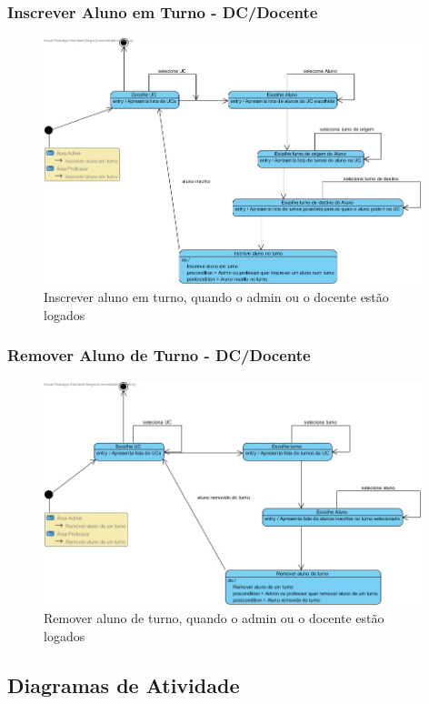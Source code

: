 \documentclass[a4paper]{article}
\begin{document}
\subsubsection{Inscrever Aluno em Turno - DC/Docente}
\begin{figure}[H]
\centering
\includegraphics[width=11cm]{MEInscreveralunoemturno}
\caption{Inscrever aluno em turno, quando o admin ou o docente estão logados}
\label{}
\end{figure}

\subsubsection{Remover Aluno de Turno - DC/Docente}
\begin{figure}[H]
\centering
\includegraphics[width=11cm]{MERemoveralunodeturno}
\caption{Remover aluno de turno, quando o admin ou o docente estão logados}
\label{}
\end{figure}

\clearpage
\subsection{Diagramas de Atividade}
\hspace{3mm}
\end{document}
